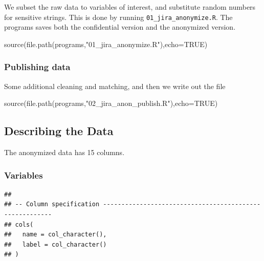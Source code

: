 \documentclass[
]{article}
\newenvironment{Shaded}{\begin{snugshade}}{\end{snugshade}}
\newcommand{\AttributeTok}[1]{\textcolor[rgb]{0.77,0.63,0.00}{#1}}
\newcommand{\ConstantTok}[1]{\textcolor[rgb]{0.00,0.00,0.00}{#1}}
\newcommand{\FunctionTok}[1]{\textcolor[rgb]{0.00,0.00,0.00}{#1}}
\newcommand{\NormalTok}[1]{#1}
\newcommand{\StringTok}[1]{\textcolor[rgb]{0.31,0.60,0.02}{#1}}
\begin{document}
We subset the raw data to variables of interest, and substitute random
numbers for sensitive strings. This is done by running
\texttt{01\_jira\_anonymize.R}. The programs saves both the confidential
version and the anonymized version.

\begin{Shaded}
\begin{Highlighting}[]
\FunctionTok{source}\NormalTok{(}\FunctionTok{file.path}\NormalTok{(programs,}\StringTok{"01\_jira\_anonymize.R"}\NormalTok{),}\AttributeTok{echo=}\ConstantTok{TRUE}\NormalTok{)}
\end{Highlighting}
\end{Shaded}

\hypertarget{publishing-data}{%
\subsubsection{Publishing data}\label{publishing-data}}

Some additional cleaning and matching, and then we write out the file

\begin{Shaded}
\begin{Highlighting}[]
\FunctionTok{source}\NormalTok{(}\FunctionTok{file.path}\NormalTok{(programs,}\StringTok{"02\_jira\_anon\_publish.R"}\NormalTok{),}\AttributeTok{echo=}\ConstantTok{TRUE}\NormalTok{)}
\end{Highlighting}
\end{Shaded}

\hypertarget{describing-the-data}{%
\subsection{Describing the Data}\label{describing-the-data}}

The anonymized data has 15 columns.

\hypertarget{variables}{%
\subsubsection{Variables}\label{variables}}

\begin{verbatim}
## 
## -- Column specification --------------------------------------------------------
## cols(
##   name = col_character(),
##   label = col_character()
## )
\end{verbatim}
\end{document}
